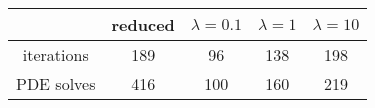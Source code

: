 \begin{tabular}{ccccc}
& reduced & $\lambda = 0.1$ & $\lambda = 1$ & $\lambda = 10$ \\
\hline
iterations & 189 & 96 & 138 & 198 \\
PDE solves & 416 & 100 & 160 & 219 \\
\hline
\end{tabular}
